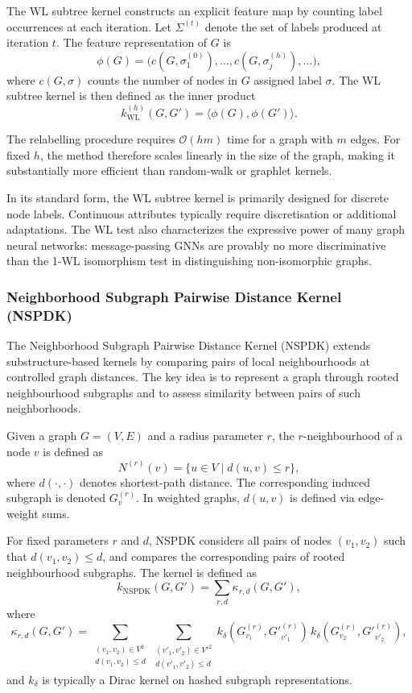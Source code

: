 The WL subtree kernel constructs an explicit feature map
by counting label occurrences at each iteration.
Let $\Sigma^{(t)}$ denote the set of labels produced
at iteration $t$.
The feature representation of $G$ is
\[
\phi(G)
=
\big(
c(G,\sigma^{(0)}_1), \dots,
c(G,\sigma^{(h)}_j), \dots
\big),
\]
where $c(G,\sigma)$ counts the number of nodes
in $G$ assigned label $\sigma$.
The WL subtree kernel is then defined as the inner product
\[
k_{\mathrm{WL}}^{(h)}(G,G')
=
\langle \phi(G), \phi(G') \rangle.
\]

The relabelling procedure requires
$\mathcal{O}(h m)$ time for a graph with $m$ edges.
For fixed $h$, the method therefore scales
linearly in the size of the graph,
making it substantially more efficient
than random-walk or graphlet kernels.

In its standard form, the WL subtree kernel
is primarily designed for discrete node labels.
Continuous attributes typically require
discretisation or additional adaptations.
The WL test also characterizes the expressive power of many graph neural
networks: message-passing GNNs are provably no more discriminative than the
1-WL isomorphism test in distinguishing non-isomorphic graphs.
\subsubsection{Neighborhood Subgraph Pairwise Distance Kernel (NSPDK)}
\label{sec:theory:nspdk}

The Neighborhood Subgraph Pairwise Distance Kernel (NSPDK)
\citep{costa2010fast}
extends substructure-based kernels by comparing
pairs of local neighbourhoods at controlled graph distances.
The key idea is to represent a graph through rooted
neighbourhood subgraphs and to assess similarity
between pairs of such neighborhoods.

Given a graph $G=(V,E)$ and a radius parameter $r$,
the $r$-neighbourhood of a node $v$ is defined as
\[
N^{(r)}(v)
=
\{ u \in V \mid d(u,v) \le r \},
\]
where $d(\cdot,\cdot)$ denotes shortest-path distance.
The corresponding induced subgraph is denoted
$G^{(r)}_v$.
In weighted graphs, $d(u,v)$ is defined via
edge-weight sums.

For fixed parameters $r$ and $d$,
NSPDK considers all pairs of nodes
$(v_1,v_2)$ such that $d(v_1,v_2)\le d$,
and compares the corresponding pairs of
rooted neighbourhood subgraphs.
The kernel is defined as
\[
k_{\mathrm{NSPDK}}(G,G')
=
\sum_{r,d}
\kappa_{r,d}(G,G'),
\]
where
\[
\kappa_{r,d}(G,G')
=
\sum_{\substack{(v_1,v_2) \in V^2 \\ d(v_1,v_2)\le d}}
\sum_{\substack{(v'_1,v'_2) \in {V'}^2 \\ d(v'_1,v'_2)\le d}}
k_\delta(G^{(r)}_{v_1},G'^{(r)}_{v'_1})
\, k_\delta(G^{(r)}_{v_2},G'^{(r)}_{v'_2}),
\]
and $k_\delta$ is typically a Dirac kernel on hashed
subgraph representations.

